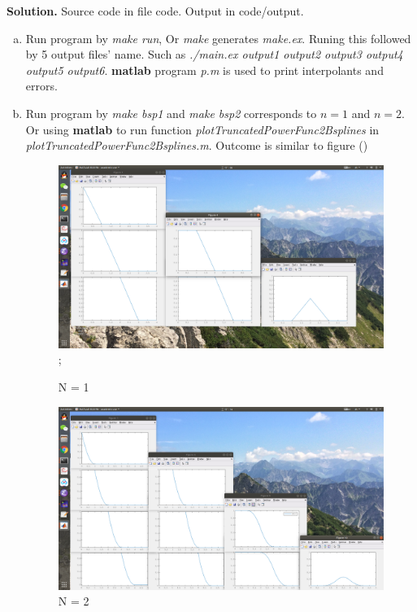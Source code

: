 \documentclass[a4paper]{book}
\newenvironment{solution}%
{\noindent\textbf{Solution.}}%
{\qedhere}
\numberwithin{equation}{chapter}
\theoremstyle{definition}
\begin{document}
\begin{solution}
  Source code in file code. Output in code/output.
  
  \begin{enumerate} [(a)]
  \item Run program by \textit{make run}, Or \textit{make} generates \textit{make.ex}. Runing this followed by 5 output files' name. Such as \textit{./main.ex output1 output2 output3 output4 output5 output6}. \textbf{matlab} program \textit{p.m} is used to print interpolants and errors.

  \item Run program by \textit{ make bsp1} and \textit{make bsp2} corresponds to $n = 1$ and $n = 2$. Or using \textbf{matlab} to run function \textit{plotTruncatedPowerFunc2Bsplines} in \textit{plotTruncatedPowerFunc2Bsplines.m}. Outcome is similar to figure ()
    \begin{figure}
      \centering
      \includegraphics[scale = 0.25]{code/n=2.png};
      \caption{N = 1}\label{fig:3}
    \end{figure}
    \begin{figure}
      \centering
      \includegraphics[scale = 0.25]{code/n=3.png}
      \caption{N = 2}\label{fig:4}
    \end{figure}
  \end{enumerate}
\end{solution}
\end{document}
